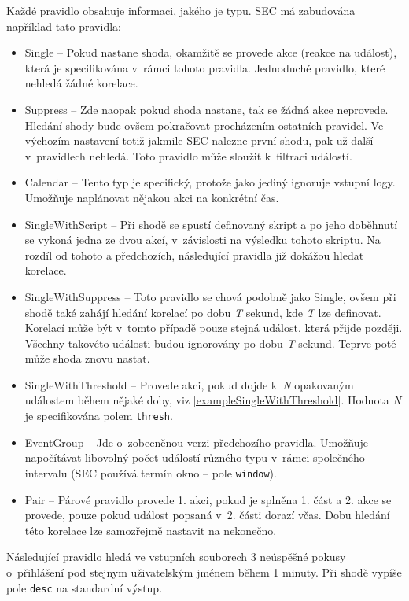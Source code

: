 \documentclass[thesis=B,czech]{FITthesis}[2012/06/26]
\begin{document}
Každé pravidlo obsahuje informaci, jakého je typu. SEC má zabudována například tato pravidla: \cite{usingSEC, secManPage}
\begin{itemize}
	\item Single -- Pokud nastane shoda, okamžitě se provede akce (reakce na událost), která je specifikována v~rámci tohoto pravidla. Jednoduché pravidlo, které nehledá žádné korelace.
	\item Suppress -- Zde naopak pokud shoda nastane, tak se žádná akce neprovede. Hledání shody bude ovšem pokračovat procházením ostatních pravidel. Ve výchozím nastavení totiž jakmile SEC nalezne první shodu, pak už další v~pravidlech nehledá. Toto pravidlo může sloužit k~filtraci událostí. 
	\item Calendar -- Tento typ je specifický, protože jako jediný ignoruje vstupní logy. Umožňuje naplánovat nějakou akci na konkrétní čas.
	\item SingleWithScript -- Při shodě se spustí definovaný skript a po jeho doběhnutí se vykoná jedna ze dvou akcí, v~závislosti na výsledku tohoto skriptu. Na rozdíl od tohoto a předchozích, následující pravidla již dokážou hledat korelace.
	\item SingleWithSuppress -- Toto pravidlo se chová podobně jako Single, ovšem při shodě také zahájí hledání korelací po dobu \textit{T} sekund, kde \textit{T} lze definovat. Korelací může být v~tomto případě pouze stejná událost, která přijde později. Všechny takovéto události budou ignorovány po dobu \textit{T} sekund. Teprve poté může shoda znovu nastat.
	\item SingleWithThreshold -- Provede akci, pokud dojde k~\textit{N} opakovaným událostem během nějaké doby, viz \ref{exampleSingleWithThreshold}. Hodnota \textit{N} je specifikována polem \texttt{thresh}.
	\item EventGroup -- Jde o~zobecněnou verzi předchozího pravidla. Umožňuje napočítávat libovolný počet událostí různého typu v~rámci společného intervalu (SEC používá termín okno -- pole \texttt{window}).
	\item Pair -- Párové pravidlo provede 1. akci, pokud je splněna 1. část a 2. akce se provede, pouze pokud událost popsaná v~2. části dorazí včas. Dobu hledání této korelace lze samozřejmě nastavit na nekonečno.
\end{itemize}

Následující pravidlo hledá ve vstupních souborech 3 neúspěšné
pokusy o~přihlášení pod stejnym uživatelským jménem během 
1 minuty. Při shodě vypíše pole \texttt{desc} na standardní výstup.
\end{document}
